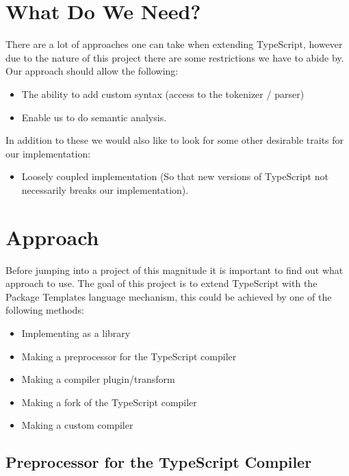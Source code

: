 \section{What Do We Need?}\label{sec:what-do-we-need}

There are a lot of approaches one can take when extending TypeScript, however due to the nature of this project there are some restrictions we have to abide by.
Our approach should allow the following:

\begin{itemize}
    \item The ability to add custom syntax (access to the tokenizer / parser)
    \item Enable us to do semantic analysis.
\end{itemize}

In addition to these we would also like to look for some other desirable traits for our implementation:

\begin{itemize}
    \item Loosely coupled implementation (So that new versions of TypeScript not necessarily breaks our implementation).
\end{itemize}


\section{Approach}\label{sec:choosing-the-right-approach}

Before jumping into a project of this magnitude it is important to find out what approach to use. 
The goal of this project is to extend TypeScript with the Package Templates language mechanism, this could be achieved by one of the following methods:

\begin{itemize}
    \item Implementing as a library
    \item Making a preprocessor for the TypeScript compiler
    \item Making a compiler plugin/transform
    \item Making a fork of the TypeScript compiler
    \item Making a custom compiler
\end{itemize}



\subsection{Preprocessor for the TypeScript Compiler}\label{subsec:preprocessor-for-the-typescript-compiler}

